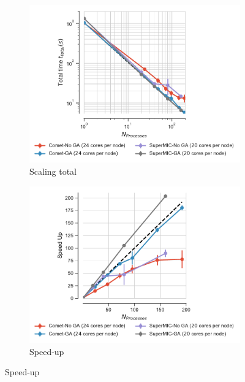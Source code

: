 \label{sec:clusters}

\begin{figure}[ht!]
\centering
\begin{subfigure}{.4\textwidth}
  \includegraphics[width=\linewidth]{figures/Comparison_t-tot-clusters_Splitting.pdf}
  \caption{Scaling total}
  \label{fig:MPIscaling-clusters-splitting}
\end{subfigure}
\hfill
\begin{subfigure}{.4\textwidth}
  \includegraphics[width=\linewidth]{figures/Comparison_speed-up-clusters_Splitting.pdf}
  \caption{Speed-up}
  \label{fig:MPIspeedup-clusters-splitting}
\end{subfigure}
\bigskip


\end{figure}
